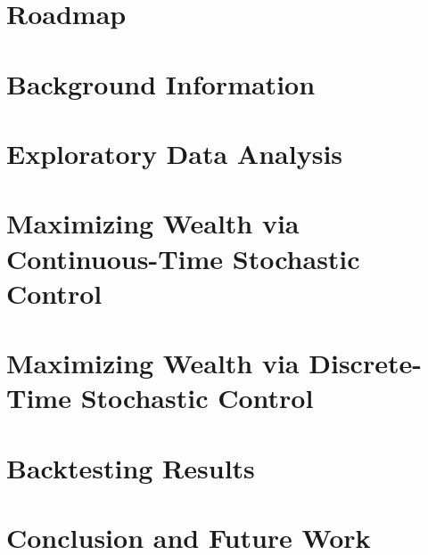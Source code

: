 \documentclass{beamer}
\begin{document}
    \maketitle
    \section*{Roadmap}

    \section{Background Information}
    
    
    \section{Exploratory Data Analysis}
    
    
    \section{Maximizing Wealth via Continuous-Time Stochastic Control}
    
    
    \section{Maximizing Wealth via Discrete-Time Stochastic Control}
    

    \section{Backtesting Results}
    
    
    \section{Conclusion and Future Work}
    
    
    \section*{}
    
    
\end{document}
